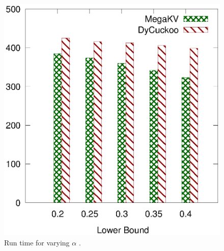 \begin{figure}[htp]
\begin{minipage}{0.19\linewidth}
		\centerline{\dsali}
	\end{minipage}
	\begin{minipage}{0.19\linewidth}\centering
		\includegraphics[width=\linewidth]{pic/dynamic/lower/dynamic_random.eps}
		\centerline{\dsrandom}
	\end{minipage}
	\caption{Run time for varying $\alpha$ .}
	\label{fig:vary-lower-time}
\end{figure}


